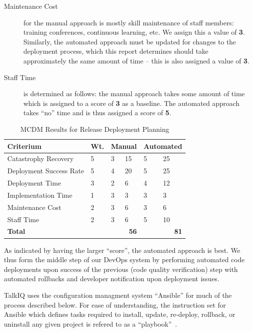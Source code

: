 \documentclass[12pt]{article}
\begin{document}
\begin{description}
\item[Maintenance Cost] for the manual approach is mostly skill maintenance of staff members: training conferences, continuous learning, etc. We assign this a value of {\bf 3}. Similarly, the automated approach must be updated for changes to the deployment process, which this report determines should take approximately the same amount of time -- this is also assigned a value of {\bf 3}.
\item[Staff Time] is determined as follows: the manual approach takes some amount of time which is assigned to a score of {\bf 3} as a baseline. The automated approach takes ``no'' time and is thus assigned a score of {\bf 5}.
\end{description}

\begin{table}[ht]
\caption{MCDM Results for Release Deployment Planning}
\label{tbl:mcdm-rdp}
\centering
\begin{tabular}{|p{5.0cm}|p{0.65cm}|p{0.5cm}|p{0.5cm}|p{0.8cm}|p{0.8cm}|}
    \hline
    {\bf Criterium} & {\bf Wt.} & \multicolumn{2}{|p{1cm}|}{{\bf Manual}} & \multicolumn{2}{|p{1.6cm}|}{{\bf \mbox{Automated}}} \\
    \hline
    \hline
    Catastrophy Recovery    &  5 & 3 & 15 & 5 & 25 \\
    Deployment Success Rate &  5 & 4 & 20 & 5 & 25 \\
    Deployment Time         &  3 & 2 &  6 & 4 & 12 \\
    Implementation Time     &  1 & 3 &  3 & 3 &  3 \\
    Maintenance Cost        &  2 & 3 &  6 & 3 &  6 \\
    Staff Time              &  2 & 3 &  6 & 5 & 10 \\
    \hline
    \hline
    {\bf Total}             &    & \multicolumn{2}{|r|}{{\bf 56}} & \multicolumn{2}{|r|}{{\bf 81}} \\
    \hline
\end{tabular}
\end{table}

As indicated by having the larger ``score'', the automated approach is best. We thus form the middle step of our DevOps system by performing automated code deployments upon success of the previous (code quality verification) step with automated rollbacks and developer notification upon deployment issues.

TalkIQ uses the configuration managment system ``Ansible'' for much of the process described below. For ease of understanding, the instruction set for Ansible which defines tasks required to install, update, re-deploy, rollback, or uninstall any given project is refered to as a ``playbook''~\cite{playbooks}.
\end{document}
